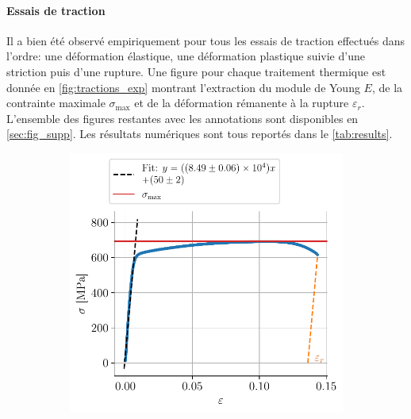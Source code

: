 \paragraph{Essais de traction}
Il a bien été observé empiriquement pour tous les essais de traction effectués dans l'ordre: une déformation élastique, une déformation plastique suivie d'une striction puis d'une rupture. Une figure pour chaque traitement thermique est donnée en \autoref{fig:tractions_exp} montrant l'extraction du module de Young $E$, de la contrainte maximale $\sigma_\mathrm{max}$ et de la déformation rémanente à la rupture $\varepsilon_r$. L'ensemble des figures restantes avec les annotations sont disponibles en \autoref{sec:fig_supp}. Les résultats numériques sont tous reportés dans le \autoref{tab:results}.
\begin{figure}[H]
    \centering
    \begin{subfigure}{0.48\linewidth}
        \centering
        \includegraphics[width=\linewidth]{figures/froid2_annotated.pdf}
        \caption{}
        \label{fig:froid2}
    \end{subfigure}
    \begin{subfigure}{0.48\linewidth}
        \centering

\end{subfigure}
\end{figure}
